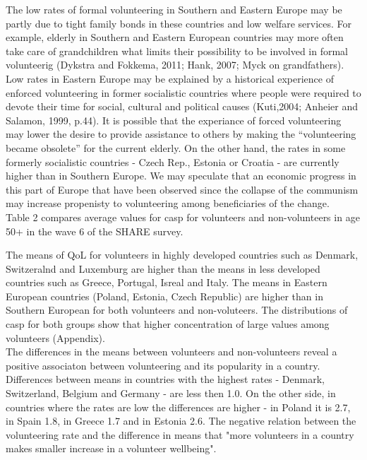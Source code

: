 \documentclass[10pt, letterpaper]{article}
\begin{document}
\begin{spacing}{1.4}
The low rates of formal volunteering in Southern and Eastern Europe may be partly due to tight family bonds in these countries and low welfare services. For example, elderly in Southern and Eastern European countries may more often take care of grandchildren what limits their possibility to be involved in formal volunteerig (Dykstra and Fokkema, 2011; Hank, 2007; Myck on grandfathers). Low rates in Eastern Europe may be explained by a historical experience of  enforced volunteering  in former socialistic countries where people were required to devote their time for social, cultural and political causes (Kuti,2004; Anheier and Salamon, 1999, p.44). It is possible that the experiance of forced volunteering  may lower the desire to provide assistance to others by making the “volunteering became obsolete” for the current elderly. On the other hand, the rates in some formerly socialistic countries - Czech Rep., Estonia or Croatia - are currently higher than in Southern Europe. We may speculate that an economic progress in this part of Europe that have been observed since the collapse of the communism may increase propenisty to volunteering among beneficiaries of the change.\\


Table 2 compares average values for casp for volunteers and non-volunteers in age 50+ in the wave 6 of the SHARE survey. \\


\begin{spacing}{.9}
\centering 
\begin{scriptsize} 
	 
      \label{CaspTtest} 
\end{scriptsize}
\end{spacing}

The means of QoL for volunteers in highly developed countries such as Denmark, Switzeralnd and Luxemburg are higher than the means in less developed  countries such as Greece, Portugal, Isreal and Italy. The means in Eastern European countries (Poland, Estonia, Czech Republic) are higher than in Southern European for both volunteers and non-voluteers. The distributions of casp for both groups show that higher concentration of large values among volunteers (Appendix). \\


The differences in the means between volunteers and non-volunteers reveal a positive associaton between volunteering and its popularity in a country.  Differences between means in countries with the highest rates  - Denmark, Switzerland, Belgium and Germany - are less then 1.0. On the other side, in countries where the rates are low the differences are higher - in Poland it is 2.7, in Spain 1.8, in Greece 1.7 and in Estonia 2.6. The negative relation between the volunteering rate and the difference in means that "more volunteers in a country makes smaller increase in a volunteer wellbeing". 


\end{spacing}
\end{document}
